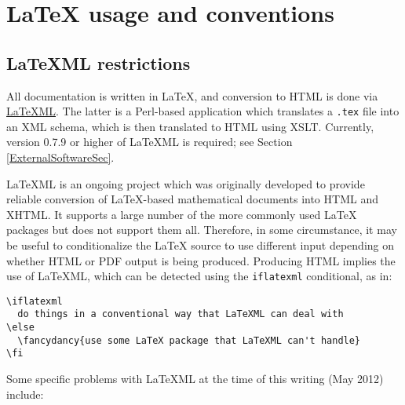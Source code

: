 \documentclass{article}
\begin{document}
\section{LaTeX usage and conventions}

\label{LatexUsage}

\subsection{LaTeXML restrictions}

All documentation is written in LaTeX, and conversion to HTML is done
via \href{http://dlmf.nist.gov/LaTeXML/}{LaTeXML}.  The latter is a
Perl-based application which translates a {\tt .tex} file into an XML
schema, which is then translated to HTML using XSLT. Currently,
version 0.7.9 or higher of LaTeXML is required; see 
Section \ref{ExternalSoftwareSec}.

LaTeXML is an ongoing project which was originally developed to
provide reliable conversion of LaTeX-based mathematical documents into
HTML and XHTML. It supports a large number of the more commonly used
LaTeX packages but does not support them all. Therefore, in some
circumstance, it may be useful to conditionalize the LaTeX source to
use different input depending on whether HTML or PDF output is being
produced. Producing HTML implies the use of LaTeXML, which can be
detected using the {\tt \BKS iflatexml} conditional, as in:

\begin{lstlisting}
\iflatexml
  do things in a conventional way that LaTeXML can deal with
\else
  \fancydancy{use some LaTeX package that LaTeXML can't handle}
\fi
\end{lstlisting}

Some specific problems with LaTeXML at the time of this writing
(May 2012) include:
\end{document}
